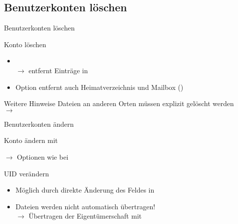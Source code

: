 \documentclass[aspectratio=43]{beamer}
\begin{document}
\subsection{Benutzerkonten löschen}
\begin{frame}{Benutzerkonten löschen}
  \begin{block}{Konto löschen}
    \begin{itemize}
      \item {} \\
      $\rightarrow$ entfernt Einträge in 
      \item Option  entfernt auch Heimatverzeichnis und Mailbox ()
    \end{itemize}
  \end{block}
  \begin{alertblock}{Weitere Hinweise}
    Dateien an anderen Orten müssen explizit gelöscht werden\\
    $\rightarrow$ 
  \end{alertblock}
\end{frame}

\begin{frame}{Benutzerkonten ändern}
  \begin{block}{Konto ändern mit }
    \begin{center}
      \colorbox{yellow}{}
    \end{center}
    $\rightarrow$ Optionen wie bei 
  \end{block}
  \begin{block}{UID verändern}
    \begin{itemize}
      \item Möglich durch direkte Änderung des Feldes in 
      \item Dateien werden nicht automatisch übertragen!\\
        $\rightarrow$ Übertragen der Eigentümerschaft mit \\
    \end{itemize}
  \end{block}
\end{frame}
\end{document}
